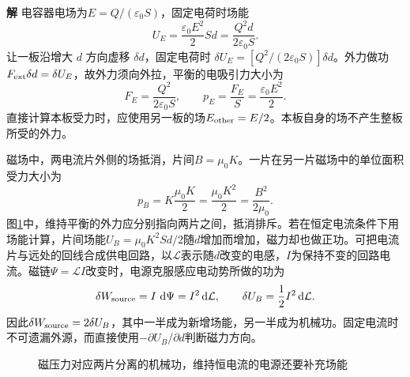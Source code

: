 \documentclass[11pt,openany,fontset=fandol]{ctexbook}
\theoremstyle{definition}\newtheorem{example}{例}[chapter]\newtheorem{exercise}{习题}[chapter]
\newcommand{\SolutionStart}{\par\medskip\ifdim\pagetotal>0pt\ifdim\dimexpr\pagegoal-\pagetotal\relax<3\baselineskip\newpage\fi\fi\noindent\textbf{解}\quad\ignorespaces}
\newenvironment{solution}{\SolutionStart}{\par\medskip}
\newcommand{\dd}{\mathop{}\!\mathrm d}\newcommand{\ee}{\mathrm e}\newcommand{\vct}[1]{\bm{#1}}
\begin{document}
\begin{solution}
电容器电场为$E=Q/(\varepsilon_0S)$，固定电荷时场能
\[
 U_E=\frac{\varepsilon_0E^2}{2}Sd
     =\frac{Q^2d}{2\varepsilon_0S}.
\]
让一板沿增大 $d$ 方向虚移 $\delta d$，固定电荷时 $\delta U_E=[Q^2/(2\varepsilon_0S)]\delta d$。外力做功 $F_{\rm ext}\delta d=\delta U_E$，故外力须向外拉，平衡的电吸引力大小为
\[
 \boxed{F_E=\frac{Q^2}{2\varepsilon_0S}},\qquad
 p_E=\frac{F_E}{S}=\frac{\varepsilon_0E^2}{2}.
\]
直接计算本板受力时，应使用另一板的场$E_{\rm other}=E/2$。本板自身的场不产生整板所受的外力。

磁场中，两电流片外侧的场抵消，片间$B=\mu_0K$。一片在另一片磁场中的单位面积受力大小为
\[
 \boxed{p_B=K\frac{\mu_0K}{2}=\frac{\mu_0K^2}{2}
                       =\frac{B^2}{2\mu_0}}.
\]
图\ref{mp5:fig:hw:l5-36-s}中，维持平衡的外力应分别指向两片之间，抵消排斥。若在恒定电流条件下用场能计算，片间场能$U_B=\mu_0K^2Sd/2$随$d$增加而增加，磁力却也做正功。可把电流片与远处的回线合成供电回路，以$\mathcal L$表示随$d$改变的电感，$I$为保持不变的回路电流。磁链$\Psi=\mathcal L I$改变时，电源克服感应电动势所做的功为
\[
\delta W_{\rm source}=I\,\dd\Psi=I^2\dd\mathcal L,
\qquad \delta U_B=\frac12I^2\dd\mathcal L.
\]
因此$\delta W_{\rm source}=2\delta U_B$，其中一半成为新增场能，另一半成为机械功。固定电流时不可遗漏外源，而直接使用$-\partial U_B/\partial d$判断磁力方向。


\begin{figure}[H]\centering
{}
\caption{磁压力对应两片分离的机械功，维持恒电流的电源还要补充场能}\label{mp5:fig:hw:l5-36-s}
\end{figure}

\end{solution}
\end{document}
